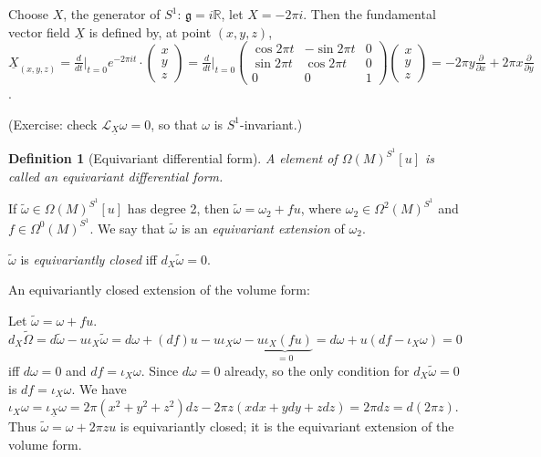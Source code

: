 \documentclass{article}
\theoremstyle{mystyle}
\newtheorem*{definition}{Definition}%
\theoremstyle{remark}
\numberwithin{equation}{section}
\begin{document}
Choose $X$, the generator of $S^1$: $\mathfrak{g} = i\mathbb{R}$, let $X = -2 \pi i$.  Then the fundamental vector field $\underline{X}$ is defined by, at point $(x,y,z)$,  $\underline{X}_{(x,y,z)} = \frac{d}{dt}\Big|_{t=0}e^{-2\pi i t}\cdot \begin{pmatrix}x\\y\\z\end{pmatrix} = \frac{d}{dt}|_{t=0} \begin{pmatrix} \cos 2\pi t & -\sin 2\pi t & 0 \\\sin2\pi t & \cos 2\pi t & 0 \\0 & 0 & 1\end{pmatrix}\begin{pmatrix}x\\y\\z\end{pmatrix} = -2\pi y \frac{\partial }{\partial x} + 2 \pi x \frac{\partial}{\partial y}$.

(Exercise: check $\mathcal{L}_{\underline{X}} \omega =0 $, so that $\omega$ is $S^1$-invariant.)

\begin{definition}[Equivariant differential form] A element of $\Omega(M)^{S^1}[u]$ is called an \emph{equivariant differential form.}
\end{definition}

If $\widetilde{\omega} \in \Omega(M)^{S^1}[u]$ has degree 2, then $\widetilde{\omega} = \omega_2 + fu$, where $\omega_2 \in \Omega^2(M)^{S^1}$ and $f\in \Omega^0(M)^{S^1}$. We say that $\widetilde{\omega}$ is an \emph{equivariant extension} of $\omega_2$. 

$\widetilde{\omega}$ is \emph{equivariantly closed} iff $d_X\widetilde{\omega} =0 $. 

An equivariantly closed extension of the volume form:

Let $\widetilde{\omega} = \omega + fu$.  $d_X\widetilde{\Omega}  = d\widetilde{\omega} - u \iota_X \widetilde{\omega} = d\omega + (df)u -u\iota_X\omega - \underbrace{u\iota_X(fu)}_{=0} = d \omega + u(df-\iota_X\omega)=0$ iff $d\omega=0$ and $df = \iota_X\omega$. Since $d\omega=0$ already, so the only condition for $d_X\widetilde{\omega}=0$ is  $df = \iota_X\omega$.  We have $\iota_X\omega = \iota_{\underline{X}}\omega
 = 2 \pi (x^2+y^2+z^2)dz - 2\pi z(xdx+ydy+zdz) = 2\pi dz = d(2\pi z)$.  Thus $\widetilde{\omega} = \omega + 2\pi z u$ is equivariantly closed; it is the equivariant extension of the volume form.
 
\end{document}
